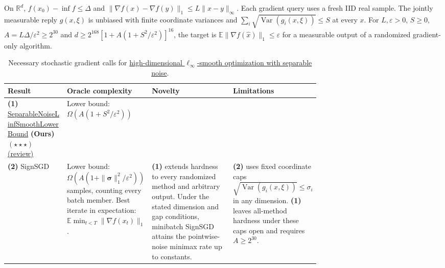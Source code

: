 \begin{table}[tp]
\centering
\caption{Necessary stochastic gradient calls for \href{https://github.com/k3nfalt/longtails/blob/main/LongTails/Setups/HighDimensionalSeparableNoiseLinfSmooth.lean}{high-dimensional $\ell_\infty$-smooth optimization with separable noise}.}\label{tab:HighDimensionalSeparableNoiseLinfSmooth}
\parbox{\linewidth}{\footnotesize On $\mathbb R^d$, $f(x_0)-\inf f\le\Delta$ and $\|\nabla f(x)-\nabla f(y)\|_1\le L\|x-y\|_\infty$. Each gradient query uses a fresh IID real sample. The jointly measurable reply $g(x,\xi)$ is unbiased with finite coordinate variances and $\sum_i\sqrt{\operatorname{Var}(g_i(x,\xi))}\le S$ at every $x$. For $L,\varepsilon>0$, $S\ge0$, $A=L\Delta/\varepsilon^2\ge2^{30}$ and $d\ge2^{168}[1+A(1+S^2/\varepsilon^2)]^{16}$, the target is $\mathbb E\|\nabla f(\hat x)\|_1\le\varepsilon$ for a measurable output of a randomized gradient-only algorithm.}\par\smallskip
\begin{threeparttable}
\footnotesize
\setlength{\tabcolsep}{4pt}\renewcommand{\arraystretch}{1.25}
\begin{tabularx}{\linewidth}{@{}>{\raggedright\arraybackslash}p{0.19\linewidth}>{\raggedright\arraybackslash}p{0.26\linewidth}>{\raggedright\arraybackslash}p{0.26\linewidth}>{\raggedright\arraybackslash}X@{}}
\toprule
\textbf{Result} & \textbf{Oracle complexity} & \textbf{Novelty} & \textbf{Limitations} \\
\midrule
\textbf{(1)} \href{https://github.com/k3nfalt/longtails/blob/main/LongTails/Theorems/SeparableNoiseLinfSmoothLowerBound.lean}{Separable\allowbreak Noise\allowbreak Linf\allowbreak Smooth\allowbreak Lower\allowbreak Bound} \textbf{(Ours)} $(\star\star\star)$ \href{https://github.com/k3nfalt/longtails/blob/main/scripts/reviews/SeparableNoiseLinfSmoothLowerBound.md}{(review)}
& Lower bound: $\Omega\!\left(A(1+S^2/\varepsilon^2)\right)$ & & \\
\midrule[1.2pt]
\textbf{(2)} SignSGD \citep[Thm.~2]{bssTaoYuZhang2026v1}
& Lower bound: $\Omega\!\left(A(1+\|\boldsymbol\sigma\|_1^2/\varepsilon^2)\right)$ samples, counting every batch member. Best iterate in expectation: $\mathbb E\min_{t<T}\|\nabla f(x_t)\|_1$.
& \textbf{(1)} extends hardness to every randomized method and arbitrary output. Under the stated dimension and gap conditions, minibatch SignSGD attains the pointwise-noise minimax rate up to constants.
& \textbf{(2)} uses fixed coordinate caps $\sqrt{\operatorname{Var}(g_i(x,\xi))}\le\sigma_i$ in any dimension. \textbf{(1)} leaves all-method hardness under these caps open and requires $A\ge2^{30}$. \\

\end{tabularx}
\end{threeparttable}
\end{table}
